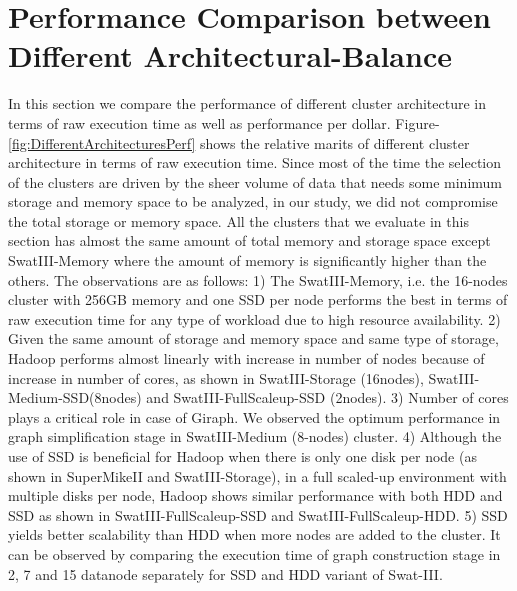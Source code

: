\documentclass[conference]{IEEEtran}
\begin{document}
\section {Performance Comparison between Different Architectural-Balance} \label{ComparingDifferentArchitecturalBalance}
In this section we compare the performance of different cluster architecture in terms of raw execution time as well as performance per dollar.
Figure-\ref{fig:DifferentArchitecturesPerf} shows the relative marits of different cluster architecture in terms of raw execution time.
Since most of the time the selection of the clusters are driven by the sheer volume of data that needs some minimum storage and memory space to be analyzed, in our study, we did not compromise the total storage or memory space. All the clusters that we evaluate in this section has almost the same amount of total memory and storage space except SwatIII-Memory where the amount of memory is significantly higher than the others.
The observations are as follows:
1) The SwatIII-Memory, i.e. the 16-nodes cluster with 256GB memory and one SSD per node performs the best in terms of raw execution time for any type of workload due to high resource availability.
2) Given the same amount of storage and memory space and same type of storage, Hadoop performs almost linearly with increase in number of nodes because of increase in number of cores, as shown in SwatIII-Storage (16nodes), SwatIII-Medium-SSD(8nodes) and SwatIII-FullScaleup-SSD (2nodes).
3) Number of cores plays a critical role in case of Giraph. We observed the optimum performance in graph simplification stage in SwatIII-Medium (8-nodes) cluster.
4) Although the use of SSD is beneficial for Hadoop when there is only one disk per node (as shown in SuperMikeII and SwatIII-Storage), in a full scaled-up environment with multiple disks per node, Hadoop shows similar performance with both HDD and SSD as shown in SwatIII-FullScaleup-SSD and SwatIII-FullScaleup-HDD.
5) SSD yields better scalability than HDD when more nodes are added to the cluster. It can be observed by comparing the execution time of graph construction stage in 2, 7 and 15 datanode separately for SSD and HDD variant of Swat-III. 
\end{document}
